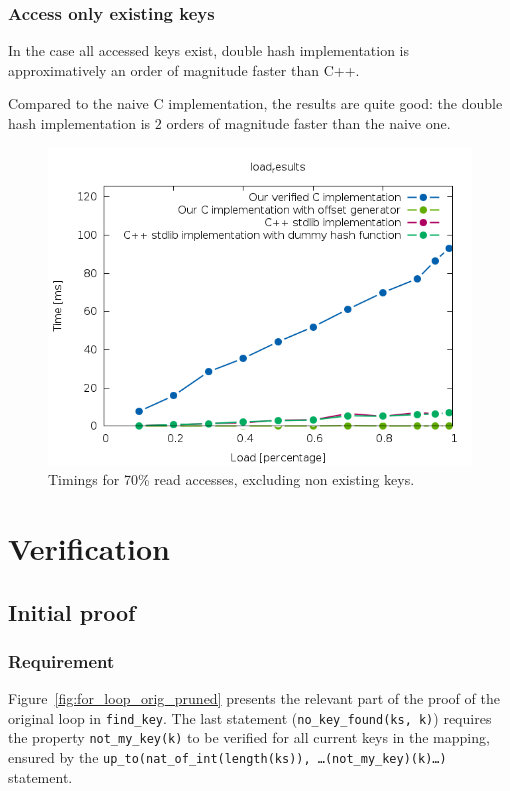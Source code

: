 \documentclass[oneside]{article}
\begin{document}
\subsubsection{Access only existing keys}
In the case all accessed keys exist, double hash implementation is approximatively an order of magnitude faster than C++. 

Compared to the naive C implementation, the results are quite good: the double hash implementation is $2$ orders of magnitude faster than the naive one.

\begin{figure}[p]
	\centering
	\includegraphics[height=.4\textheight]{result_example_no_contains.png}
	\caption{Timings for 70\% read accesses, excluding non existing keys.}
	\label{fig:result_no_contains}
\end{figure}

\section{Verification}

\subsection{Initial proof}
\subsubsection{Requirement}
Figure~\ref{fig:for_loop_orig_pruned} presents the relevant part of the proof of the original loop in \texttt{find\_key}. The last statement (\texttt{no\_key\_found(ks, k)}) requires the property \texttt{not\_my\_key(k)} to be verified for all current keys in the mapping, ensured by the \texttt{up\_to(nat\_of\_int(length(ks)), \ldots(not\_my\_key)(k)\ldots)} statement.
\end{document}
